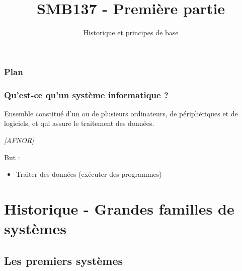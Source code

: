 

\title{SMB137 - Première partie}
\subtitle{Historique et principes de base}



\frame[plain]{\titlepage}

\begin{frame}
 \frametitle{Plan} 
 \tableofcontents
\end{frame} 

\begin{frame}
 \frametitle{Qu'est-ce qu'un système informatique ?}

  \begin{definition}
Ensemble constitué d'un ou de plusieurs ordinateurs, de périphériques et de logiciels, et qui assure le traitement des données.

\textit{[AFNOR]}
\end{definition}
But :
\begin{itemize}
\item Traiter des données (exécuter des programmes)
\end{itemize}
 \end{frame} 
 

\section{Historique - Grandes familles de systèmes}
\subsection{Les premiers systèmes}

